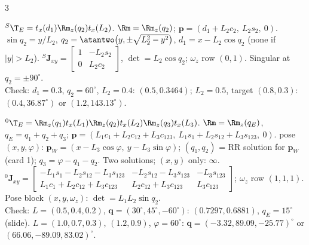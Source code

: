 \begin{multicols}{3}
\begin{fbx}
${}^S\T_E=t_x(d_1)\Rm_z(q_2)t_x(L_2)$.
$\Rm=\Rm_z(q_2)$; $\mathbf p=(d_1+L_2c_2,\ L_2s_2,\ 0)$.
$\sin q_2=y/L_2$, $q_2=\atantwo\big(y,\pm\sqrt{L_2^2-y^2}\big)$, $d_1=x-L_2\cos q_2$ (none if $|y|>L_2$).
${}^S\mathbf J_{xy}=\begin{bmatrix}1&-L_2s_2\\0&L_2c_2\end{bmatrix}$, $\det=L_2\cos q_2$; $\omega_z$ row $(0,1)$. Singular at $q_2=\pm90^\circ$.\\
Check: $d_1=0.3$, $q_2=60^\circ$, $L_2=0.4$: $(0.5,0.3464)$; $L_2=0.5$, target $(0.8,0.3)$: $(0.4,36.87^\circ)$ or $(1.2,143.13^\circ)$. \chk
\end{fbx}

\begin{fbx}
${}^0\T_E=\Rm_z(q_1)t_x(L_1)\Rm_z(q_2)t_x(L_2)\Rm_z(q_3)t_x(L_3)$.
$\Rm=\Rm_z(q_E)$, $q_E=q_1{+}q_2{+}q_3$; $\mathbf p=(L_1c_1+L_2c_{12}+L_3c_{123},\ L_1s_1+L_2s_{12}+L_3s_{123},\ 0)$.
pose $(x,y,\varphi)$: $\mathbf p_W=(x-L_3\cos\varphi,\ y-L_3\sin\varphi)$; $(q_1,q_2)$ = RR solution for $\mathbf p_W$ (card 1); $q_3=\varphi-q_1-q_2$. Two solutions; $(x,y)$ only: $\infty$.
${}^0\mathbf J_{xy}=\begin{bmatrix}-L_1s_1-L_2s_{12}-L_3s_{123}&-L_2s_{12}-L_3s_{123}&-L_3s_{123}\\L_1c_1+L_2c_{12}+L_3c_{123}&L_2c_{12}+L_3c_{123}&L_3c_{123}\end{bmatrix}$; $\omega_z$ row $(1,1,1)$. Pose block $(x,y,\omega_z)$: $\det=L_1L_2\sin q_2$.\\
Check: $L=(0.5,0.4,0.2)$, $\mathbf q=(30^\circ,45^\circ,-60^\circ)$: $(0.7297,0.6881)$, $q_E=15^\circ$ (slide). $L=(1.0,0.7,0.3)$, $(1.2,0.9)$, $\varphi=60^\circ$: $\mathbf q=(-3.32,89.09,-25.77)^\circ$ or $(66.06,-89.09,83.02)^\circ$. \chk
\end{fbx}


\end{multicols}
